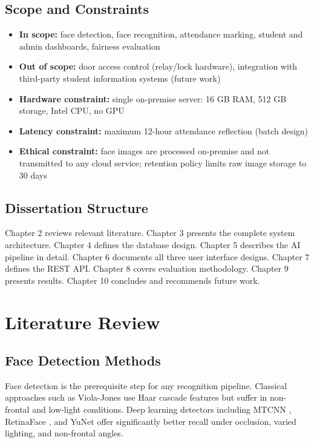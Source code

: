 \documentclass[12pt,a4paper]{report}
\begin{document}
\section{Scope and Constraints}
\begin{itemize}
  \item \textbf{In scope:} face detection, face recognition, attendance marking, student and admin dashboards, fairness evaluation
  \item \textbf{Out of scope:} door access control (relay/lock hardware), integration with third-party student information systems (future work)
  \item \textbf{Hardware constraint:} single on-premise server: 16 GB RAM, 512 GB storage, Intel CPU, no GPU
  \item \textbf{Latency constraint:} maximum 12-hour attendance reflection (batch design)
  \item \textbf{Ethical constraint:} face images are processed on-premise and not transmitted to any cloud service; retention policy limits raw image storage to 30 days
\end{itemize}

\section{Dissertation Structure}
Chapter 2 reviews relevant literature. Chapter 3 presents the complete system architecture. Chapter 4 defines the database design. Chapter 5 describes the AI pipeline in detail. Chapter 6 documents all three user interface designs. Chapter 7 defines the REST API. Chapter 8 covers evaluation methodology. Chapter 9 presents results. Chapter 10 concludes and recommends future work.

\chapter{Literature Review}

\section{Face Detection Methods}
Face detection is the prerequisite step for any recognition pipeline. Classical approaches such as Viola-Jones \cite{viola2001rapid} use Haar cascade features but suffer in non-frontal and low-light conditions. Deep learning detectors including MTCNN \cite{zhang2016joint}, RetinaFace \cite{deng2020retinaface}, and YuNet \cite{wu2023yunet} offer significantly better recall under occlusion, varied lighting, and non-frontal angles.
\end{document}
